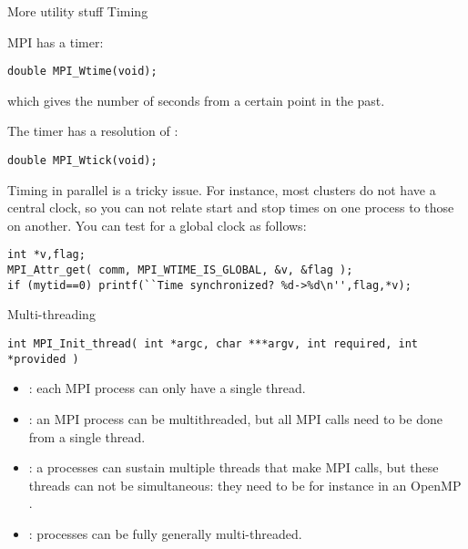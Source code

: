  {More utility stuff}
 {Timing}

MPI has a  timer: 
\begin{verbatim}
double MPI_Wtime(void);
\end{verbatim}
which gives the number of seconds from a certain point in the past.

The timer has a resolution of :
\begin{verbatim}
double MPI_Wtick(void);
\end{verbatim}

Timing in parallel is a tricky issue. For instance, most clusters do
not have a central clock, so you can not relate start and stop times
on one process to those on another. You can test for a global clock as
follows:
\begin{verbatim}
int *v,flag;
MPI_Attr_get( comm, MPI_WTIME_IS_GLOBAL, &v, &flag );
if (mytid==0) printf(``Time synchronized? %d->%d\n'',flag,*v);
\end{verbatim}


 {Multi-threading}

\begin{verbatim}
int MPI_Init_thread( int *argc, char ***argv, int required, int *provided )
\end{verbatim}

\begin{itemize}
\item {}: each MPI process can only have
  a single thread.
\item {}: an MPI process can be
  multithreaded, but all MPI calls need to be done from a single
  thread.
\item {}: a processes can sustain
  multiple threads that make MPI calls, but these threads can not be
  simultaneous: they need to be for instance in an OpenMP
  .
\item {}: processes can be fully
  generally multi-threaded.
\end{itemize}
